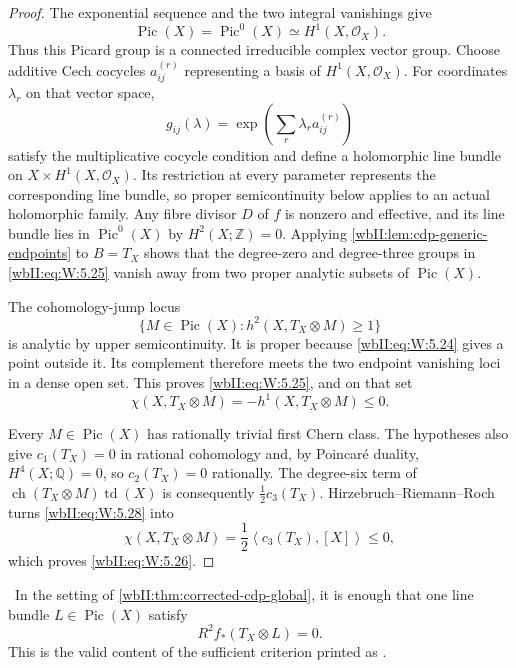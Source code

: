 \begin{proof}
The exponential sequence and the two integral vanishings give
\[
 \operatorname{Pic}(X)=\operatorname{Pic}^0(X)
 \simeq H^1(X,\mathcal O_X).
\tag{W.54}\label{wbII:eq:W:5.27}
\]
Thus this Picard group is a connected irreducible complex vector group.
Choose additive Cech cocycles $a^{(r)}_{ij}$ representing a basis of
$H^1(X,\mathcal O_X)$. For coordinates $\lambda_r$ on that vector space,
\[
 g_{ij}(\lambda)=\exp\!\left(\sum_r\lambda_r a^{(r)}_{ij}\right)
\]
satisfy the multiplicative cocycle condition and define a holomorphic
line bundle on $X\times H^1(X,\mathcal O_X)$. Its restriction at every
parameter represents the corresponding line bundle, so proper
semicontinuity below applies to an actual holomorphic family.  Any fibre divisor \(D\) of
\(f\) is nonzero and effective, and its line bundle lies in
\(\operatorname{Pic}^0(X)\) by \(H^2(X;\mathbb Z)=0\).  Applying
\cref{wbII:lem:cdp-generic-endpoints} to \(B=T_X\) shows that the degree-zero and
degree-three groups in \eqref{wbII:eq:W:5.25} vanish away from two proper analytic subsets
of \(\operatorname{Pic}(X)\).

The cohomology-jump locus
\[
 \{M\in\operatorname{Pic}(X):h^2(X,T_X\otimes M)\ge1\}
\]
is analytic by upper semicontinuity.  It is proper because \eqref{wbII:eq:W:5.24} gives a
point outside it.  Its complement therefore meets the two endpoint
vanishing loci in a dense open set.  This proves \eqref{wbII:eq:W:5.25}, and on that set
\[
 \chi(X,T_X\otimes M)=-h^1(X,T_X\otimes M)\le0.
\tag{W.55}\label{wbII:eq:W:5.28}
\]

Every \(M\in\operatorname{Pic}(X)\) has rationally trivial first Chern
class.  The hypotheses also give \(c_1(T_X)=0\) in rational cohomology and,
by Poincar\'e duality, \(H^4(X;\mathbb Q)=0\), so
\(c_2(T_X)=0\) rationally.  The degree-six term of
\(\operatorname{ch}(T_X\otimes M)\operatorname{td}(X)\) is consequently
\(\tfrac12c_3(T_X)\).  Hirzebruch--Riemann--Roch turns \eqref{wbII:eq:W:5.28} into
\[
 \chi(X,T_X\otimes M)
 =\frac12\left\langle c_3(T_X),[X]\right\rangle\le0,
\]
which proves \eqref{wbII:eq:W:5.26}.
\end{proof}

\begin{corollary}\label{wbII:cor:corrected-cdp-relative}\label{wbII:cor:relative}
\ In the setting of
\cref{wbII:thm:corrected-cdp-global}, it is enough that one line bundle
\(L\in\operatorname{Pic}(X)\) satisfy
\[
 R^2f_*(T_X\otimes L)=0.
\tag{W.56}\label{wbII:eq:W:5.29}
\]
This is the valid content of the sufficient criterion printed as
\cite[Proposition~2.4, p.~680]{CDP20}.
\end{corollary}


